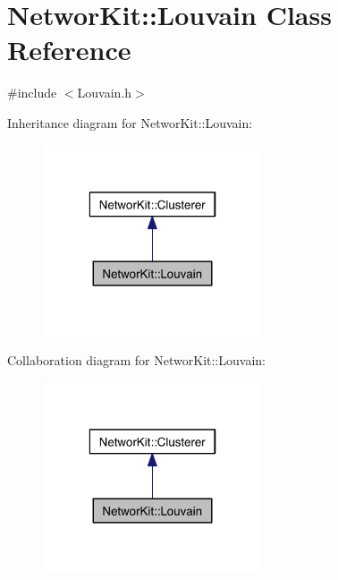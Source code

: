 \hypertarget{class_networ_kit_1_1_louvain}{\section{Networ\-Kit\-:\-:Louvain Class Reference}
\label{class_networ_kit_1_1_louvain}
}


{\ttfamily \#include $<$Louvain.\-h$>$}



Inheritance diagram for Networ\-Kit\-:\-:Louvain\-:\nopagebreak
\begin{figure}[H]
\begin{center}
\leavevmode
\includegraphics[width=184pt]{class_networ_kit_1_1_louvain__inherit__graph}
\end{center}
\end{figure}


Collaboration diagram for Networ\-Kit\-:\-:Louvain\-:\nopagebreak
\begin{figure}[H]
\begin{center}
\leavevmode
\includegraphics[width=184pt]{class_networ_kit_1_1_louvain__coll__graph}
\end{center}
\end{figure}
